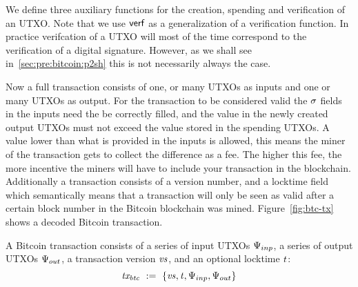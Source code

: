 We define three auxiliary functions for the creation, spending and verification of an UTXO.
Note that we use $\mathsf{verf}$ as a generalization of a verification function.
In practice verifcation of a UTXO will most of the time correspond to the verification of a digital signature.
However, as we shall see in~\ref{sec:pre:bitcoin:p2sh} this is not necessarily always the case.

\begin{center}
    \fbox{
    \begin{varwidth}{\textwidth}
        \procedure[linenumbering]{$\procCreateUTXO{\varValue}{\varScriptPubKey}$} {
        \pcreturn \varUTXO \opAssign \{ \varValue \opAssign \varValue, \varScriptPubKey \opAssign \varScriptPubKey,
        \varScriptSig \opAssign \cnstEmptySet \}
        } \\
        \procedure[linenumbering]{$\procSpendUTXO{\varUTXO}{\varScriptSig}$} {
        \{ \varValue, \varScriptPubKey \} \opFunResult \varUTXO \\
        \pcreturn \varUTXO \opAssign \{ \varValue \opAssign \varValue, \varScriptPubKey \opAssign \varScriptPubKey,
        \varScriptSig \opAssign \varScriptSig \}
        } \\
        \procedure[linenumbering]{$\procVerfUTXO{\varUTXO}$} {
        \{ \varValue, \varScriptPubKey, \varScriptSig \} \opFunResult \varUTXO \\
        \pcreturn \procVerf{\varScriptPubKey}{\varScriptSig}{\varValue}
        }
    \end{varwidth}
    }
\end{center}

Now a full transaction consists of one, or many UTXOs as inputs and one or many UTXOs as output.
For the transaction to be considered valid the $\mathit{\sigma}$ fields in the inputs need the be correctly filled, and the value in the newly created output UTXOs must not exceed the value stored in the spending UTXOs.
A value lower than what is provided in the inputs is allowed, this means the miner of the transaction gets to collect the difference as a fee.
The higher this fee, the more incentive the miners will have to include your transaction in the blockchain.
Additionally a transaction consists of a version number, and a locktime field which semantically means that a
transaction will only be seen as valid after a certain block number in the Bitcoin blockchain was mined.
Figure~\ref{fig:btc-tx} shows a decoded Bitcoin transaction.

\begin{definition}
    A Bitcoin transaction consists of a series of input UTXOs $\Psi_{inp}$, a series of output UTXOs $\Psi_{out}$, a
    transaction version $\mathit{vs}$, and an optional locktime $\mathit{t}$:
    \[ \mathit{tx_{btc}} ~:=~ \{ \mathit{vs}, \mathit{t}, \Psi_{inp}, \Psi_{out} \} \]
\end{definition}

